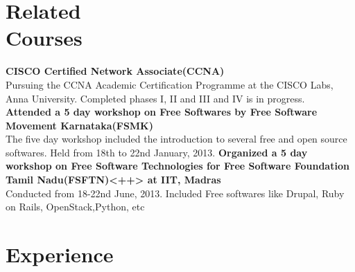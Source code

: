 \documentclass[margin,line]{resume}
\begin{document}
\begin{resume}
    \section{\mysidestyle Related\\Courses} 
    \textbf{CISCO Certified Network Associate(CCNA)} \\Pursuing the CCNA Academic Certification Programme at the CISCO Labs, Anna University. Completed phases I, II and III and IV is in progress. \vspace{2mm}\\\vspace{1mm}%
    \textbf{Attended a 5 day workshop on Free Softwares by Free Software Movement Karnataka(FSMK)}\\The five day workshop included the introduction to several free and open source softwares. Held from 18th to 22nd January, 2013.  \vspace{2mm}\vspace{1mm}%
    \textbf{Organized a 5 day workshop on Free Software Technologies for Free Software Foundation Tamil Nadu(FSFTN)<++> at IIT, Madras}\\Conducted from 18-22nd June, 2013. Included Free softwares like Drupal, Ruby on Rails, OpenStack,Python, etc  \vspace{2mm}\vspace{1mm}%

    \section{\mysidestyle Experience}


\end{resume}
\end{document}
